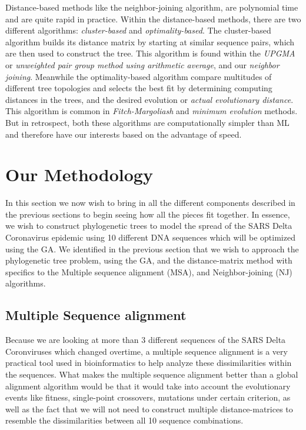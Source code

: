 Distance-based methods like the neighbor-joining algorithm, are polynomial time and are quite rapid in practice. Within the distance-based methods, there are two different algorithms: \emph{cluster-based} and \emph{optimality-based}. The cluster-based algorithm builds its distance matrix by starting at similar sequence pairs, which are then used to construct the tree. This algorithm is found within the \emph{UPGMA} or \emph{unweighted pair group method using arithmetic average}, and our \emph{neighbor joining}. Meanwhile the optimality-based algorithm compare multitudes of different tree topologies and selects the best fit by determining computing distances in the trees, and the desired evolution or \emph{actual evolutionary distance}. This algorithm is common in \emph{Fitch-Margoliash} and \emph{minimum evolution} methods. But in retrospect, both these algorithms are computationally simpler than ML and therefore have our interests based on the advantage of speed.  

\section{Our Methodology}

In this section we now wish to bring in all the different components described in the previous sections to begin seeing how all the pieces fit together. In essence, we wish to construct phylogenetic trees to model the spread of the SARS Delta Coronavirus epidemic using 10 different DNA sequences which will be optimized using the GA. We identified in the previous section that we wish to approach the phylogenetic tree problem, using the GA, and the distance-matrix method with specifics to the Multiple sequence alignment (MSA), and Neighbor-joining (NJ) algorithms. 

\subsection{Multiple Sequence alignment}

Because we are looking at more than 3 different sequences of the SARS Delta Coronviruses which changed overtime, a multiple sequence alignment is a very practical tool used in bioinformatics to help analyze these dissimilarities within the sequences. What makes the multiple sequence alignment better than a global alignment algorithm would be that it would take into account the evolutionary events like fitness, single-point crossovers, mutations under certain criterion, as well as the fact that we will not need to construct multiple distance-matrices to resemble the dissimilarities between all 10 sequence combinations. 

